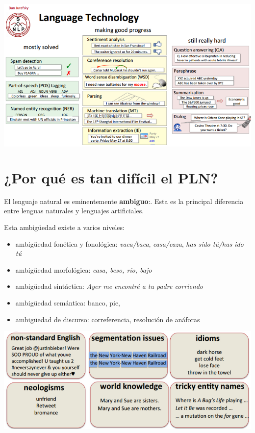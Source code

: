 \documentclass[]{tufte-handout}
\begin{document}
\includegraphics{img/langtech-progress.png}

\section{¿Por qué es tan difícil el
PLN?}\label{por-que-es-tan-dificil-el-pln}

El lenguaje natural es eminentemente \textbf{ambiguo}:. Esta es la
principal diferencia entre lenguas naturales y lenguajes artificiales.

Esta ambigüedad existe a varios niveles:

\begin{itemize}
\item
  ambigüedad fonética y fonológica: \emph{vaca/baca}, \emph{casa/caza},
  \emph{has sido tú/has ido tú}
\item
  ambigüedad morfológica: \emph{casa, beso, río, bajo}
\item
  ambigüedad sintáctica: \emph{Ayer me encontré a tu padre corriendo}
\item
  ambigüedad semántica: banco, pie,
\item
  ambigüedad de discurso: correferencia, resolución de anáforas
\end{itemize}

\includegraphics{img/nlp-difficulties.png}
\end{document}
